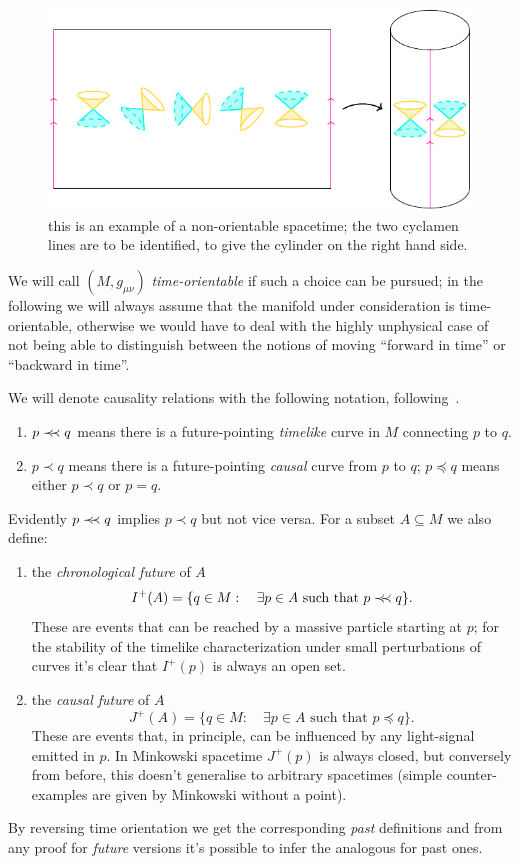\begin{figure}
	\caption[]{this is an example of a non-orientable spacetime; the two cyclamen lines are to be identified, to give the cylinder on the right hand side.}
	\label{fig:time-orientable}
	\centering
	\includegraphics[scale=1.2]{Immagini/time-orientable/time-orientable.pdf}
\end{figure}
We will call \((M, g_{\mu\nu})\) \emph{time-orientable} if such a  choice can be pursued; in the following we will always assume that the manifold under consideration is time-orientable, otherwise we would have to deal with the highly unphysical case of not being able to distinguish between the notions of moving ``forward in time'' or ``backward in time''.

We will denote causality relations with the following notation, following~\cite{o1983semi}.
\begin{enumerate}
	\item  \(p \prec\mathrel{\mkern-5mu}\prec q\) means there is a future-pointing \emph{timelike} curve in \(M\) connecting \(p\) to \(q\).
	\item \(p \prec q\) means there is a future-pointing \emph{causal} curve from \(p\) to \(q\); \(p \preceq q\) means either \(p \prec q\) or \(p = q\).
\end{enumerate}
Evidently \(p\prec\mathrel{\mkern-5mu}\prec q\) implies \(p\prec q\) but not vice versa. For a subset \(A \subseteq M\) we also define:
\begin{enumerate}
	\item the \emph{chronological future} of \(A\)
	\[
	I^+(A) =\{ q\in M :\quad\exists p \in A\text{ such that } p\prec\mathrel{\mkern-5mu}\prec q\}.
	\]
	These are events that can be reached by a massive particle starting at \(p\); for the stability of the timelike characterization under small perturbations of curves it's clear that \(I^+(p)\) is always an open set.
	\item the \emph{causal future} of \(A\)
	\[
	J^+(A) =\{ q\in M : \quad\exists p \in A\text{ such that } p\preceq q\}.
	\]
	These are events that, in principle, can be influenced by any light-signal emitted in \(p\). In Minkowski spacetime \(J^+(p)\) is always closed, but conversely from before, this doesn't generalise to arbitrary spacetimes (simple counter-examples are given by Minkowski without a point).
\end{enumerate}
By reversing time orientation we get the corresponding \emph{past} definitions and from any proof for \emph{future} versions it's possible to infer the analogous for past ones.

